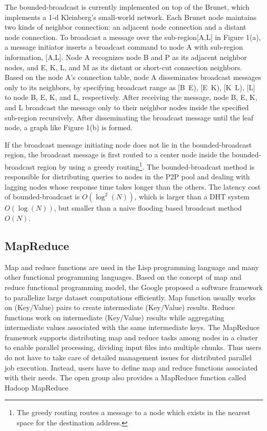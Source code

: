 \documentclass{acm_proc_article-sp}
\begin{document}
The bounded-broadcast is currently implemented on top of the Brunet\cite{brunet}, which implements a 1-d Kleinberg's small-world network.
Each Brunet node maintains two kinds of neighbor connection: an adjacent node connection and a distant node connection.
To broadcast a message over the sub-region[A,L] in Figure 1(a), a message initiator inserts a broadcast command to node A with sub-region information, [A,L]. 
Node A recognizes node B and P as its adjacent neighbor nodes, and  E, K, L, and M as its distant or short-cut connection neighbors.
Based on the node A's connection table, node A disseminates broadcast messages only to its neighbors, by specifying broadcast range as [B~E), [E~K), [K~L), [L] to node B, E, K, and L, respectively.
After receiving the message, node B, E, K, and L broadcast the message only to their neighbor nodes inside the specified sub-region recursively. 
After disseminating the broadcast message until the leaf node, a graph like Figure 1(b) is formed.

If the broadcast message initiating node does not lie in the bounded-broadcast region, the broadcast message is first routed to a center node inside the bounded-broadcast region by using a greedy routing\footnote{The greedy routing routes a message to a node which exists in the nearest space for the destination address.}.
The bounded-broadcast method is responsible for distributing queries to nodes in the P2P pool and dealing with lagging nodes whose response time takes longer than the others. 
The latency cost of bounded-broadcast is  $O(\log^2(N))$\cite{deetoo}, which is larger than a DHT system $O(\log(N))$\cite{chord}, but smaller than a naive flooding based broadcast method$O(N)$.


\subsection{MapReduce}
Map and reduce functions are used in the Lisp programming language and many other functional programming languages. 
Based on the concept of map and reduce functional programming model, the Google proposed a software framework to parallelize large dataset computations efficiently\cite{google_mapreduce}.
Map function usually works on (Key/Value) pairs to create intermediate (Key/Value) results. 
Reduce functions work on intermediate (Key/Value) results while aggregating intermediate values associated with the same intermediate keys.
The MapReduce framework supports distributing map and reduce tasks among nodes in a cluster to enable parallel processing, dividing input files into multiple chunks. 
Thus users do not have to take care of detailed management issues for distributed parallel job execution. 
Instead, users have to define map and reduce functions associated with their needs.
The open group also provides a MapReduce function called Hadoop MapReduce\cite{hadoop}
\end{document}
